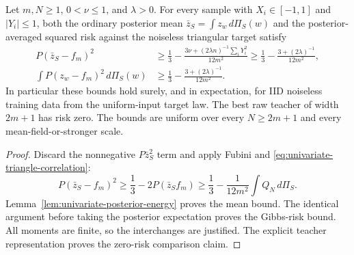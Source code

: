 \begin{theorem}
\label{thm:univariate-schedule-obstruction}
Let $m,N\ge1$, $0<\nu\le1$, and $\lambda>0$. For every sample
with $X_i\in[-1,1]$ and $|Y_i|\le1$, both the ordinary posterior
mean $\bar z_S=\int z_w\,d\Pi_S(w)$ and the posterior-averaged
squared risk against the noiseless triangular target satisfy
\begin{align}
 P(\bar z_S-f_m)^2
 &\ge\frac13-\frac{3\nu+(2\lambda n)^{-1}\sum_iY_i^2}{12m^2}
 \ge\frac13-\frac{3+(2\lambda)^{-1}}{12m^2},
       \label{eq:univariate-schedule-lower}\\
 \int P(z_w-f_m)^2\,d\Pi_S(w)
 &\ge\frac13-\frac{3+(2\lambda)^{-1}}{12m^2}.
       \label{eq:univariate-schedule-gibbs-lower}
\end{align}
In particular these bounds hold surely, and in expectation, for
IID noiseless training data from the uniform-input target law.
The best raw teacher of width $2m+1$ has risk zero. The bounds are
uniform over every $N\ge2m+1$ and every mean-field-or-stronger scale.
\end{theorem}
\begin{proof}
Discard the nonnegative $P\bar z_S^2$ term and apply Fubini and
\eqref{eq:univariate-triangle-correlation}:
\[
 P(\bar z_S-f_m)^2
 \ge\frac13-2P(\bar z_S f_m)
 \ge\frac13-\frac1{12m^2}\int Q_N\,d\Pi_S.
\]
Lemma~\ref{lem:univariate-posterior-energy} proves the mean bound.
The identical argument before taking the posterior expectation
proves the Gibbs-risk bound. All moments are finite, so the
interchanges are justified. The explicit teacher representation
proves the zero-risk comparison claim.
\end{proof}

